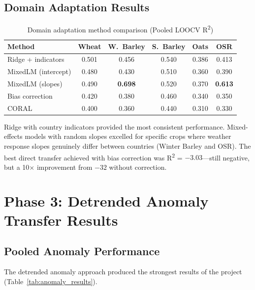 \documentclass[12pt,a4paper]{report}
\newcommand{\rsq}{R\textsuperscript{2}}
\begin{document}
\subsection{Domain Adaptation Results}

\begin{table}[H]
\centering
\caption{Domain adaptation method comparison (Pooled LOOCV \rsq{})}
\label{tab:domain_adaptation_results}
\begin{tabular}{lccccc}
\toprule
\textbf{Method} & \textbf{Wheat} & \textbf{W.~Barley} & \textbf{S.~Barley} & \textbf{Oats} & \textbf{OSR} \\
\midrule
Ridge + indicators & 0.501 & 0.456 & 0.540 & 0.386 & 0.413 \\
MixedLM (intercept) & 0.480 & 0.430 & 0.510 & 0.360 & 0.390 \\
MixedLM (slopes) & 0.490 & \textbf{0.698} & 0.520 & 0.370 & \textbf{0.613} \\
Bias correction & 0.420 & 0.380 & 0.460 & 0.340 & 0.350 \\
CORAL & 0.400 & 0.360 & 0.440 & 0.310 & 0.330 \\
\bottomrule
\end{tabular}
\end{table}

Ridge with country indicators provided the most consistent performance. Mixed-effects models with random slopes excelled for specific crops where weather response slopes genuinely differ between countries (Winter Barley and OSR). The best direct transfer achieved with bias correction was \rsq{} = $-3.03$---still negative, but a 10$\times$ improvement from $-32$ without correction.

\section{Phase 3: Detrended Anomaly Transfer Results}
\label{sec:anomaly_results}

\subsection{Pooled Anomaly Performance}

The detrended anomaly approach produced the strongest results of the project (Table~\ref{tab:anomaly_results}).
\end{document}

